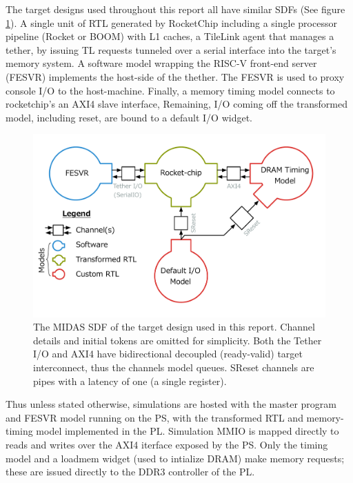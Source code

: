 The target designs used throughout this report all have similar SDFs (See
figure \ref{fig:default-target}).  A single unit of RTL generated by RocketChip
including a single processor pipeline (Rocket or BOOM) with L1 caches, a
TileLink agent that manages a tether, by issuing TL requests tunneled over a
serial interface into the target's memory system. A software model wrapping the
RISC-V front-end server (FESVR) implements the host-side of the thether. The
FESVR is used to proxy console I/O to the host-machine.  Finally, a memory
timing model connects to rocketchip's an AXI4 slave interface, Remaining, I/O
coming off the transformed model, including reset, are bound to a default I/O
widget.

\begin{figure}
	\centering
	\includegraphics[width=16cm]{figures/masters-target.pdf}
    \caption{The MIDAS SDF of the target design used in this report. Channel
    details and initial tokens are omitted for simplicity. Both the Tether I/O
    and AXI4 have bidirectional decoupled (ready-valid) target interconnect,
    thus the channels model queues. SReset channels are pipes with
    a latency of one (a single register).}
	\label{fig:default-target}
\end{figure}

Thus unless stated otherwise, simulations are hosted with the master program
and FESVR model running on the PS, with the transformed RTL and memory-timing
model implemented in the PL. Simulation MMIO is mapped directly to reads and
writes over the AXI4 iterface exposed by the PS. Only the timing model and a
loadmem widget (used to intialize DRAM) make memory requests; these are issued
directly to the DDR3 controller of the PL.
